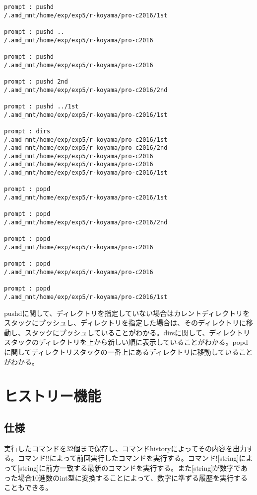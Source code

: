 \documentclass{procreport}
\begin{document}
\begin{screen}
\begin{verbatim}
prompt : pushd
/.amd_mnt/home/exp/exp5/r-koyama/pro-c2016/1st

prompt : pushd ..
/.amd_mnt/home/exp/exp5/r-koyama/pro-c2016

prompt : pushd
/.amd_mnt/home/exp/exp5/r-koyama/pro-c2016

prompt : pushd 2nd
/.amd_mnt/home/exp/exp5/r-koyama/pro-c2016/2nd

prompt : pushd ../1st
/.amd_mnt/home/exp/exp5/r-koyama/pro-c2016/1st

prompt : dirs
/.amd_mnt/home/exp/exp5/r-koyama/pro-c2016/1st
/.amd_mnt/home/exp/exp5/r-koyama/pro-c2016/2nd
/.amd_mnt/home/exp/exp5/r-koyama/pro-c2016
/.amd_mnt/home/exp/exp5/r-koyama/pro-c2016
/.amd_mnt/home/exp/exp5/r-koyama/pro-c2016/1st

prompt : popd
/.amd_mnt/home/exp/exp5/r-koyama/pro-c2016/1st

prompt : popd
/.amd_mnt/home/exp/exp5/r-koyama/pro-c2016/2nd

prompt : popd
/.amd_mnt/home/exp/exp5/r-koyama/pro-c2016

prompt : popd
/.amd_mnt/home/exp/exp5/r-koyama/pro-c2016

prompt : popd
/.amd_mnt/home/exp/exp5/r-koyama/pro-c2016/1st
\end{verbatim}
\end{screen}
pushdに関して、ディレクトリを指定していない場合はカレントディレクトリをスタックにプッシュし、ディレクトリを指定した場合は、そのディレクトリに移動し、スタックにプッシュしていることがわかる。dirsに関して、ディレクトリスタックのディレクトリを上から新しい順に表示していることがわかる。popdに関してディレクトリスタックの一番上にあるディレクトリに移動していることがわかる。


\section{ヒストリー機能}

\subsection{仕様}
実行したコマンドを32個まで保存し、コマンドhistoryによってその内容を出力する。コマンド!!によって前回実行したコマンドを実行する。コマンド![string]によって[string]に前方一致する最新のコマンドを実行する。また[string]が数字であった場合10進数のint型に変換することによって、数字に準ずる履歴を実行することもできる。
\end{document}
